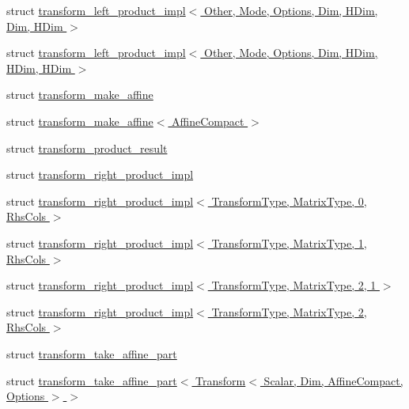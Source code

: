 \begin{DoxyCompactItemize}
struct \hyperlink{struct_eigen_1_1internal_1_1transform__left__product__impl_3_01_other_00_01_mode_00_01_options_037bfaa634250d504931892f5ae22fc66}{transform\+\_\+left\+\_\+product\+\_\+impl$<$ Other, Mode, Options, Dim, H\+Dim, Dim, H\+Dim $>$}
\item 
struct \hyperlink{struct_eigen_1_1internal_1_1transform__left__product__impl_3_01_other_00_01_mode_00_01_options_0d7a5c2fda4fe7320ea55777493bf1a2a}{transform\+\_\+left\+\_\+product\+\_\+impl$<$ Other, Mode, Options, Dim, H\+Dim, H\+Dim, H\+Dim $>$}
\item 
struct \hyperlink{struct_eigen_1_1internal_1_1transform__make__affine}{transform\+\_\+make\+\_\+affine}
\item 
struct \hyperlink{struct_eigen_1_1internal_1_1transform__make__affine_3_01_affine_compact_01_4}{transform\+\_\+make\+\_\+affine$<$ Affine\+Compact $>$}
\item 
struct \hyperlink{struct_eigen_1_1internal_1_1transform__product__result}{transform\+\_\+product\+\_\+result}
\item 
struct \hyperlink{struct_eigen_1_1internal_1_1transform__right__product__impl}{transform\+\_\+right\+\_\+product\+\_\+impl}
\item 
struct \hyperlink{struct_eigen_1_1internal_1_1transform__right__product__impl_3_01_transform_type_00_01_matrix_type_00_010_00_01_rhs_cols_01_4}{transform\+\_\+right\+\_\+product\+\_\+impl$<$ Transform\+Type, Matrix\+Type, 0, Rhs\+Cols $>$}
\item 
struct \hyperlink{struct_eigen_1_1internal_1_1transform__right__product__impl_3_01_transform_type_00_01_matrix_type_00_011_00_01_rhs_cols_01_4}{transform\+\_\+right\+\_\+product\+\_\+impl$<$ Transform\+Type, Matrix\+Type, 1, Rhs\+Cols $>$}
\item 
struct \hyperlink{struct_eigen_1_1internal_1_1transform__right__product__impl_3_01_transform_type_00_01_matrix_type_00_012_00_011_01_4}{transform\+\_\+right\+\_\+product\+\_\+impl$<$ Transform\+Type, Matrix\+Type, 2, 1 $>$}
\item 
struct \hyperlink{struct_eigen_1_1internal_1_1transform__right__product__impl_3_01_transform_type_00_01_matrix_type_00_012_00_01_rhs_cols_01_4}{transform\+\_\+right\+\_\+product\+\_\+impl$<$ Transform\+Type, Matrix\+Type, 2, Rhs\+Cols $>$}
\item 
struct \hyperlink{struct_eigen_1_1internal_1_1transform__take__affine__part}{transform\+\_\+take\+\_\+affine\+\_\+part}
\item 
struct \hyperlink{struct_eigen_1_1internal_1_1transform__take__affine__part_3_01_transform_3_01_scalar_00_01_dim_08d14c40ff031aad52694585e78471f26}{transform\+\_\+take\+\_\+affine\+\_\+part$<$ Transform$<$ Scalar, Dim, Affine\+Compact, Options $>$ $>$}

\end{DoxyCompactItemize}
